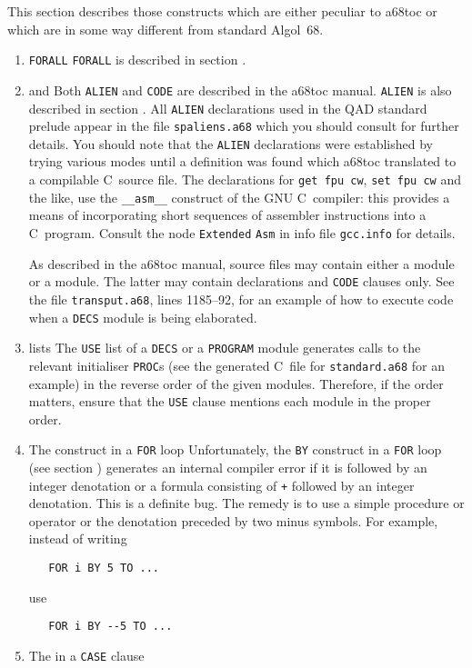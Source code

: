This section describes those constructs which are either peculiar to
a68toc or which are in some way different from standard Algol~68.
\begin{enumerate}
\item \verb|FORALL|\newline
\verb|FORALL| is described in section .

\item {} and \newline
Both \verb|ALIEN| and \verb|CODE| are described in the a68toc manual.
\verb|ALIEN| is also described in section . All
\verb|ALIEN| declarations used in the QAD standard prelude appear in
the file \verb|spaliens.a68| which you should consult for further
details.  You should note that the \verb|ALIEN| declarations were
established by trying various modes until a definition was found
which a68toc translated to a compilable C~source file. The
declarations for \verb|get fpu cw|, \verb|set fpu cw| and the like,
use the \verb|__asm__| construct of the GNU C~compiler: this provides
a means of incorporating short sequences of assembler instructions
into a C~program. Consult the node \verb|Extended| \verb|Asm| in info
file \verb|gcc.info| for details.

As described in the a68toc manual, source files may contain either a
 module or a  module. The latter may contain
declarations and \verb|CODE| clauses only. See the file
\verb|transput.a68|, lines 1185--92, for an example of how to execute
code when a \verb|DECS| module is being elaborated.

\item {} lists\newline
The \verb|USE| list of a \verb|DECS| or a \verb|PROGRAM| module
generates calls to the relevant initialiser \verb|PROC|s (see the
generated C~file for \verb|standard.a68| for an example) in the reverse
order of the given modules. Therefore, if the order matters, ensure
that the \verb|USE| clause mentions each module in the proper order.

\item The  construct in a \verb|FOR| loop\newline
Unfortunately, the \verb|BY| construct in a \verb|FOR| loop (see
section ) generates an internal compiler error if it is
followed by an integer denotation or a formula consisting of \verb|+|
followed by an integer denotation. This
is a definite bug. The remedy is to use a simple procedure or operator
or the denotation preceded by two minus symbols. For example, instead of writing
\begin{verbatim}
   FOR i BY 5 TO ...
\end{verbatim}
\noindent
use
\begin{verbatim}
   FOR i BY --5 TO ...
\end{verbatim}
\item The  in a
\verb|CASE| clause\newline


\end{enumerate}
